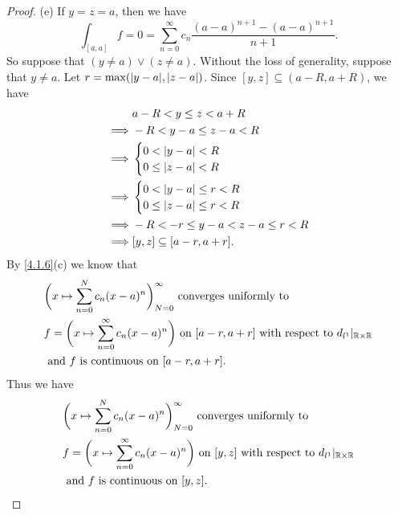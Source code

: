\begin{proof}{(e)}
  If \(y = z = a\), then we have
  \[
    \int_{[a, a]} f = 0 = \sum_{n = 0}^\infty c_n \frac{(a - a)^{n + 1} - (a - a)^{n + 1}}{n + 1}.
  \]
  So suppose that \((y \neq a) \lor (z \neq a)\).
  Without the loss of generality, suppose that \(y \neq a\).
  Let \(r = \max(\abs{y - a}, \abs{z - a})\).
  Since \([y, z] \subseteq (a - R, a + R)\), we have
  \begin{align*}
             & a - R < y \leq z < a + R              \\
    \implies & -R < y - a \leq z - a < R             \\
    \implies & \begin{cases}
                 0 < \left\lvert y - a\right\rvert < R \\
                 0 \leq \left\lvert z - a\right\rvert < R
               \end{cases}                 \\
    \implies & \begin{cases}
                 0 < \left\lvert y - a\right\rvert \leq r < R \\
                 0 \leq \left\lvert z - a\right\rvert \leq r < R
               \end{cases}          \\
    \implies & -R < -r \leq y - a < z - a \leq r < R \\
    \implies & [y, z] \subseteq [a - r, a + r].
  \end{align*}
  By \cref{4.1.6}(c) we know that
  \begin{align*}
     & \bigg(x \mapsto \sum_{n = 0}^N c_n (x - a)^n\bigg)_{N = 0}^\infty \text{ converges uniformly to }                                       \\
     & f = \bigg(x \mapsto \sum_{n = 0}^\infty c_n (x - a)^n\bigg) \text{ on } [a - r, a + r] \text{ with respect to } d_{l^1}|_{\mathbb{R} \times \mathbb{R}} \\
     & \text{ and } f \text{ is continuous on } [a - r, a + r].
  \end{align*}
  Thus we have
  \begin{align*}
     & \bigg(x \mapsto \sum_{n = 0}^N c_n (x - a)^n\bigg)_{N = 0}^\infty \text{ converges uniformly to }                               \\
     & f = \bigg(x \mapsto \sum_{n = 0}^\infty c_n (x - a)^n\bigg) \text{ on } [y, z] \text{ with respect to } d_{l^1}|_{\mathbb{R} \times \mathbb{R}} \\
     & \text{ and } f \text{ is continuous on } [y, z].
  \end{align*}

\end{proof}
